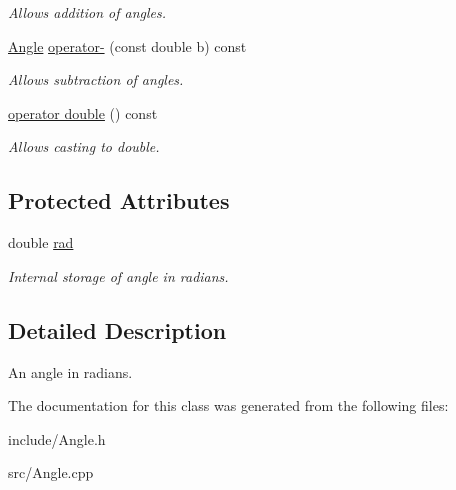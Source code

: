 \begin{DoxyCompactItemize}
\begin{DoxyCompactList}\small\item\em Allows addition of angles. \end{DoxyCompactList}\item 
\hypertarget{class_angle_abd92854d2b365b13dc22d112494bfb8b}{\hyperlink{class_angle}{Angle} \hyperlink{class_angle_abd92854d2b365b13dc22d112494bfb8b}{operator-\/} (const double b) const }\label{class_angle_abd92854d2b365b13dc22d112494bfb8b}

\begin{DoxyCompactList}\small\item\em Allows subtraction of angles. \end{DoxyCompactList}\item 
\hypertarget{class_angle_a319d0a071ba66f5499d79a44e7d2fe04}{\hyperlink{class_angle_a319d0a071ba66f5499d79a44e7d2fe04}{operator double} () const }\label{class_angle_a319d0a071ba66f5499d79a44e7d2fe04}

\begin{DoxyCompactList}\small\item\em Allows casting to double. \end{DoxyCompactList}\end{DoxyCompactItemize}
\subsection*{Protected Attributes}
\begin{DoxyCompactItemize}
\item 
\hypertarget{class_angle_a63dbc530a0ca010e8c655b9d8ff8844e}{double \hyperlink{class_angle_a63dbc530a0ca010e8c655b9d8ff8844e}{rad}}\label{class_angle_a63dbc530a0ca010e8c655b9d8ff8844e}

\begin{DoxyCompactList}\small\item\em Internal storage of angle in radians. \end{DoxyCompactList}\end{DoxyCompactItemize}


\subsection{Detailed Description}
An angle in radians. 

The documentation for this class was generated from the following files\+:\begin{DoxyCompactItemize}
\item 
include/Angle.\+h\item 
src/Angle.\+cpp\end{DoxyCompactItemize}
